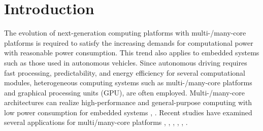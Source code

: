 



\chapter{Introduction}
\label{chap:introduction}
The evolution of next-generation computing platforms with multi-/many-core platforms is required to satisfy the increasing demands for computational power with reasonable power consumption.
This trend also applies to embedded systems such as those used in autonomous vehicles.
Since autonomous driving requires fast processing, predictability, and energy efficiency for several computational modules,  heterogeneous computing systems such as multi-/many-core platforms and graphical processing units (GPU), are often employed.
 Multi-/many-core architectures can realize high-performance and general-purpose computing with low power consumption for embedded systems \cite{becker2016contention}, \cite{perret2016mapping}.
Recent studies have examined several applications for multi/many-core platforms \cite{becker2016contention}, \cite{saidi2015shift}, \cite{perret2016temporal}, \cite{perret2016mapping}, \cite{becker2014mapping}, \cite{BURGIO2017299}.


